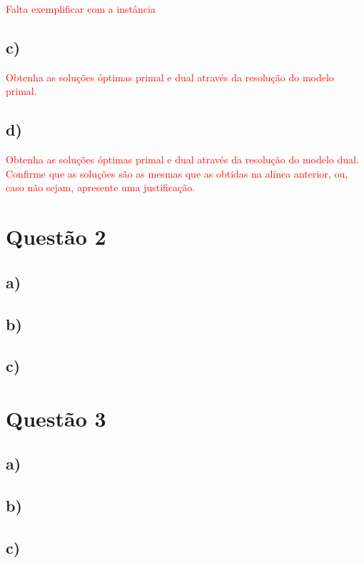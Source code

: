 \documentclass[11pt]{article} %
\begin{document}
\textcolor{red}{Falta exemplificar com a instância}

\subsection*{c)}
\textcolor{red}{Obtenha as soluções óptimas primal e dual através da resolução do modelo primal.}

\subsection*{d)}
\textcolor{red}{Obtenha as soluções óptimas primal e dual através da resolução do modelo dual. Confirme que as soluções são as mesmas que as obtidas na alínea anterior, ou, caso não sejam, apresente uma justificação.}

\section*{Questão 2}
\subsection*{a)}
\subsection*{b)}
\subsection*{c)}

\section*{Questão 3}
\subsection*{a)}
\subsection*{b)}
\subsection*{c)}
\end{document}

